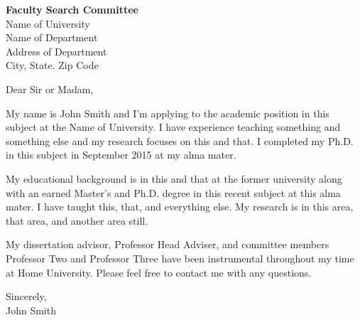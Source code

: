 \documentclass[letterpaper,11pt,oneside]{article}
\begin{document}
\begin{flushleft}
 \textbf{Faculty Search Committee}         \\
 Name of University \\
Name of Department                  \\
Address of Department \\
City, State. Zip Code
\end{flushleft}

\vspace{2em}

Dear Sir or Madam, \\

\vspace{1em}
\onehalfspacing

My name is John Smith and I'm applying to the academic position in this subject at the Name of University. I have experience teaching something and something else and my research focuses on this and that. I completed my Ph.D. in this subject in September 2015 at my alma mater.

\vspace{1em}

My educational background is in this and that at the former university along with an earned Master's and Ph.D. degree in this recent subject at this alma mater. I have taught this, that, and everything else. My research is in this area, that area, and another area still.

\vspace{1em}

My dissertation advisor, Professor Head Adviser, and committee members Professor Two and Professor Three have been instrumental throughout my time at Home University. Please feel free to contact me with any questions.

\vspace{1em}

\begin{flushright}
Sincerely, \\
\vspace{1em} 
\vspace{1em} 
John Smith \\
\end{flushright}
\end{document}
